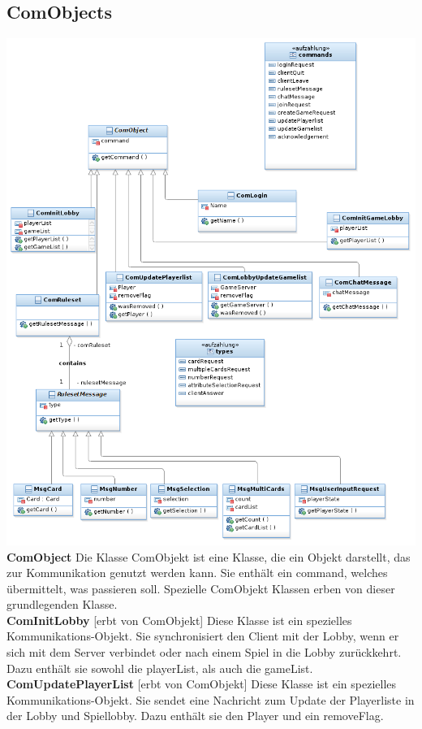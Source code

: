 \documentclass{article}
\begin{document}
\subsection{ComObjects}
\includegraphics[width=\textwidth]{ComDiagram}
\textbf{ComObject} Die Klasse ComObjekt ist eine Klasse, die ein Objekt darstellt, das zur Kommunikation genutzt werden kann. Sie enthält ein command, welches übermittelt, was passieren soll. Spezielle ComObjekt Klassen erben von dieser grundlegenden Klasse.\\
		\textbf{ComInitLobby} [erbt von ComObjekt] Diese Klasse ist ein spezielles Kommunikations-Objekt. Sie synchronisiert den Client mit der Lobby, wenn er sich mit dem Server verbindet oder nach einem Spiel in die Lobby zurückkehrt. Dazu enthält sie sowohl die playerList, als auch die gameList.\\
		\textbf{ComUpdatePlayerList} [erbt von ComObjekt] Diese Klasse ist ein spezielles Kommunikations-Objekt. Sie sendet eine Nachricht zum Update der Playerliste in der Lobby und Spiellobby. Dazu enthält sie den Player und ein removeFlag.\\
\end{document}
